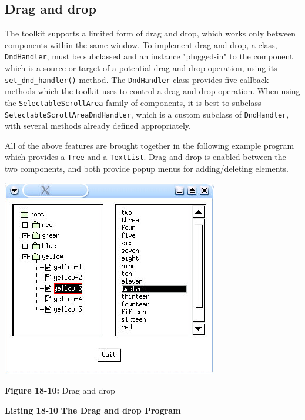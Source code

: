 \subsection*{Drag and drop}

The toolkit supports a limited form of drag and drop, which works only between
components within the same window.
To implement drag and drop, a class, \texttt{DndHandler}, must be
subclassed and an instance "plugged-in" to
the component which is a source or target of a potential drag and drop
operation, using its \texttt{set\_dnd\_handler()} method.
The \texttt{DndHandler} class provides five callback methods which the
toolkit uses to control a drag and drop operation.
When using the \texttt{SelectableScrollArea} family of components, it is
best to subclass \texttt{SelectableScrollAreaDndHandler}, which is a
custom subclass of \texttt{DndHandler}, with several methods already
defined appropriately.

All of the above features are brought together in the following example
program which provides a \texttt{Tree} and a \texttt{TextList}. Drag
and drop is enabled between the two components, and both provide popup
menus for adding/deleting elements.

\bigskip

\bigskip

\begin{center}
\includegraphics[width=3.7189in,height=3.3846in]{ub-img/ub-img59.jpg}
\end{center}

{\sffamily\bfseries Figure 18-10:}
{\sffamily Drag and drop}

\bigskip

{\sffamily\bfseries Listing 18-10}
{\sffamily\bfseries The Drag and drop Program}

